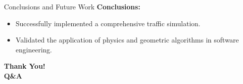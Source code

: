 \documentclass[aspectratio=169, 10pt]{beamer}
\begin{document}
\begin{frame}{Conclusions and Future Work}
    \textbf{Conclusions:}
    \begin{itemize}
        \item Successfully implemented a comprehensive traffic simulation.
        \item Validated the application of physics and geometric algorithms in software engineering.
    \end{itemize}
\end{frame}

\begin{frame}
    \centering
    \Huge \textbf{Thank You!}\\
    \vspace{0.5cm}
    \Large \textbf{Q\&A}
\end{frame}
\end{document}
